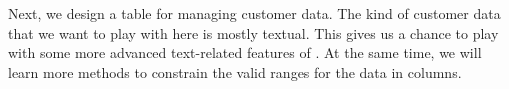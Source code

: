 %
\label{sec:factory:table:customer}%
Next, we design a table for managing customer data.
The kind of customer data that we want to play with here is mostly textual.
This gives us a chance to play with some more advanced text-related features of .
At the same time, we will learn more methods to constrain the valid ranges for the data in columns.%
%
%
%
%
\FloatBarrier%
\endhsection%
%
